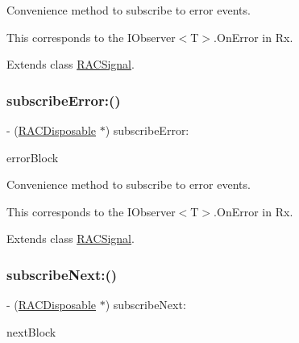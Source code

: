 Convenience method to subscribe to {\ttfamily error} events.

This corresponds to the {\ttfamily I\+Observer$<$T$>$.On\+Error} in Rx. 

Extends class \mbox{\hyperlink{interface_r_a_c_signal_a6e792da9c8499ad5791e14bd126e99cb}{R\+A\+C\+Signal}}.

\mbox{\label{category_r_a_c_signal_07_subscription_08_a6e792da9c8499ad5791e14bd126e99cb}} 
\subsubsection{\texorpdfstring{subscribe\+Error\+:()}{subscribeError:()}\hspace{0.1cm}{\footnotesize\ttfamily [3/3]}}
{\footnotesize\ttfamily -\/ (\mbox{\hyperlink{interface_r_a_c_disposable}{R\+A\+C\+Disposable}} $\ast$) subscribe\+Error\+: \begin{DoxyParamCaption}\item[{(void($^\wedge$)(N\+S\+Error $\ast$error))}]{error\+Block }\end{DoxyParamCaption}}

Convenience method to subscribe to {\ttfamily error} events.

This corresponds to the {\ttfamily I\+Observer$<$T$>$.On\+Error} in Rx. 

Extends class \mbox{\hyperlink{interface_r_a_c_signal_a6e792da9c8499ad5791e14bd126e99cb}{R\+A\+C\+Signal}}.

\mbox{\label{category_r_a_c_signal_07_subscription_08_a50d000f05e61411c438e616475deb7f8}} 
\subsubsection{\texorpdfstring{subscribe\+Next\+:()}{subscribeNext:()}\hspace{0.1cm}{\footnotesize\ttfamily [1/3]}}
{\footnotesize\ttfamily -\/ (\mbox{\hyperlink{interface_r_a_c_disposable}{R\+A\+C\+Disposable}} $\ast$) subscribe\+Next\+: \begin{DoxyParamCaption}\item[{(void($^\wedge$)(id x))}]{next\+Block }\end{DoxyParamCaption}}

